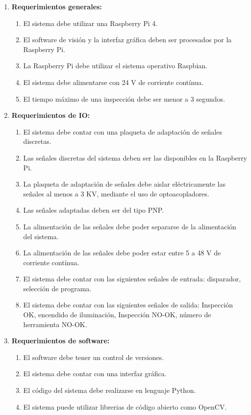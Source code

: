 \documentclass[
11pt, %
codirector, %
]{charter}
\begin{document}
\begin{enumerate}

	\item \textbf{Requerimientos generales:}
	\begin{enumerate}
		\item El sistema debe utilizar una Raspberry Pi 4. \REQ
		\item El software de visión y la interfaz gráfica deben ser procesados por la Raspberry Pi. \REQ
		\item La Raspberry Pi debe utilizar el sistema operativo Raspbian. \REQ
		\item El sistema debe alimentarse con 24 V de corriente contínua. \REQ
		\item El tiempo máximo de una inspección debe ser menor a 3 segundos. \REQ	
	\end{enumerate}
	
	\item \textbf{Requerimientos de IO:}
	\begin{enumerate}
		\item El sistema debe contar con una plaqueta de adaptación de señales discretas. \REQ
		\item Las señales discretas del sistema deben ser las disponibles en la Raspberry Pi. \REQ
		\item La plaqueta de adaptación de señales debe aislar eléctricamente las señales al menos a 3 KV, mediante el uso de optoacopladores. \REQ
		\item Las señales adaptadas deben ser del tipo PNP. \REQ
		\item La alimentación de las señales debe poder separarse de la alimentación del sistema. \REQ
		\item La alimentación de las señales debe poder estar entre 5 a 48 V de corriente contínua. \REQ
		\item El sistema debe contar con las siguientes señales de entrada: disparador, selección de programa. \REQ
		\item El sistema debe contar con las siguientes señales de salida: Inspección OK, encendido de iluminación, Inspección NO-OK, número de herramienta NO-OK. \REQ
	\end{enumerate}
	
	\item \textbf{Requerimientos de software:}
	\begin{enumerate}
		\item El software debe tener un control de versiones. \REQ
		\item El sistema debe contar con una interfaz gráfica. \REQ
		\item El código del sistema debe realizarse en lenguaje Python. \REQ
		\item El sistema puede utilizar librerias de código abierto como OpenCV. \REQ
	\end{enumerate}
	

\end{enumerate}
\end{document}
